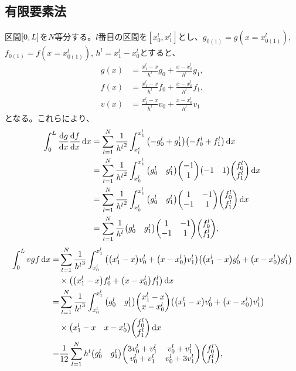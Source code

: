 \documentclass[xelatex,ja=standard]{bxjsarticle}
\begin{document}
\subsection{有限要素法}
区間$\qty[0,L]$を$N$等分する。$l$番目の区間を$[x^l_0,x^l_1]$とし、$g_{0(1)} = g(x=x^l_{0(1)})$, $f_{0(1)} = f(x=x^l_{0(1)})$, $h^l = x^l_1 - x^l_0$とすると、
\begin{align}
    g(x) &= \frac{x^l_1 - x}{h^l}g_0 + \frac{x-x^l_0}{h^l}g_1,\\
    f(x) &= \frac{x^l_1 - x}{h^l}f_0 + \frac{x-x^l_0}{h^l}f_1,\\
    v(x) &= \frac{x^l_1 - x}{h^l}v_0 + \frac{x-x^l_0}{h^l}v_1
\end{align}
となる。これらにより、
\begin{align}
    \int_0^L \dv{g}{x}\dv{f}{x}\dd{x} 
    &= \sum_{l=1}^N \frac{1}{{h^l}^2}\int_{x_l^e}^{x^l_1}\qty(-g^l_0 + g^l_1)\qty(-f^l_0 + f^l_1)\dd{x}\notag\\
    &= \sum_{l=1}^N \frac{1}{{h^l}^2}\int_{x^l_0}^{x^l_1}\mqty(g^l_0 & g^l_1)\mqty(-1\\1)\mqty(-1 & 1)\mqty(f^l_0 \\ f^l_1)\dd{x}\notag\\
    &= \sum_{l=1}^N \frac{1}{{h^l}^2}\int_{x^l_0}^{x^l_1}\mqty(g^l_0 & g^l_1)\mqty(1 & -1 \\ -1 & 1)\mqty(f^l_0 \\ f^l_1)\dd{x}\notag\\
    &= \sum_{l=1}^N \frac{1}{h^l}\mqty(g^l_0 & g^l_1)\mqty(1 & -1 \\ -1 & 1)\mqty(f^l_0 \\ f^l_1),
\end{align}
\begin{align}
    \int_0^L vgf\dd{x}
    =& \sum_{l=1}^N \frac{1}{{h^l}^3}\int_{x^l_0}^{x^l_1}
    \qty(\qty(x^l_1 - x)v^l_0 + \qty(x-x^l_0)v^l_1)
    \qty(\qty(x^l_1 - x)g^l_0 + \qty(x-x^l_0)g^l_1)\notag\\
    &\times\qty(\qty(x^l_1 - x)f^l_0 + \qty(x-x^l_0)f^l_1)
    \dd{x}\notag\\
    =& \sum_{l=1}^N \frac{1}{{h^l}^3}\int_{x^l_0}^{x^l_1}
    \mqty(g^l_0 & g^l_1) \mqty(x^l_1 - x \\ x-x^l_0)
    \qty(\qty(x^l_1 - x)v^l_0 + \qty(x-x^l_0)v^l_1)\notag\\
    &\times\mqty(x^l_1 - x & x-x^l_0)\mqty(f^l_0 \\ f^l_1)
    \dd{x}\notag\\
    =& \frac{1}{12}\sum_{l=1}^N h^l
    \mqty(g^l_0 & g^l_1) \mqty(3v_0^l +v_1^l & v_0^l +v_1^l\\ v_0^l +v_1^l&v_0^l +3v_1^l)\mqty(f^l_0 \\ f^l_1),
\end{align}
\end{document}
